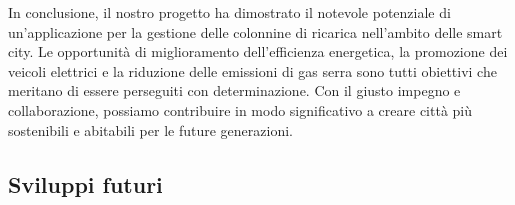 In conclusione, il nostro progetto ha dimostrato il notevole potenziale di un'applicazione per la gestione delle colonnine di ricarica nell'ambito delle smart city. Le opportunità di miglioramento dell'efficienza energetica, la promozione dei veicoli elettrici e la riduzione delle emissioni di gas serra sono tutti obiettivi che meritano di essere perseguiti con determinazione. Con il giusto impegno e collaborazione, possiamo contribuire in modo significativo a creare città più sostenibili e abitabili per le future generazioni.

\subsection{Sviluppi futuri}

\newpage